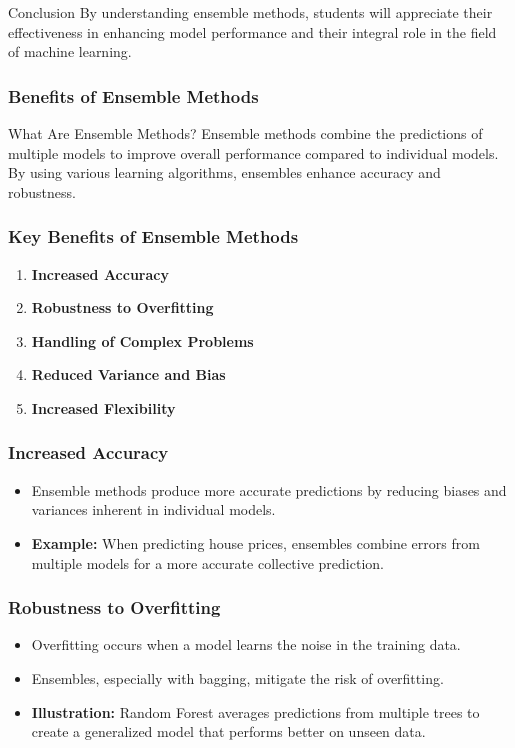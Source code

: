 \documentclass[aspectratio=169]{beamer}
\begin{document}
\begin{frame}[fragile]{Conclusion}
    By understanding ensemble methods, students will appreciate their effectiveness in enhancing model performance and their integral role in the field of machine learning.
\end{frame}

\begin{frame}[fragile]
    \frametitle{Benefits of Ensemble Methods}
    \begin{block}{What Are Ensemble Methods?}
        Ensemble methods combine the predictions of multiple models to improve overall performance compared to individual models. By using various learning algorithms, ensembles enhance accuracy and robustness.
    \end{block}
\end{frame}

\begin{frame}[fragile]
    \frametitle{Key Benefits of Ensemble Methods}
    \begin{enumerate}
        \item \textbf{Increased Accuracy}
        \item \textbf{Robustness to Overfitting}
        \item \textbf{Handling of Complex Problems}
        \item \textbf{Reduced Variance and Bias}
        \item \textbf{Increased Flexibility}
    \end{enumerate}
\end{frame}

\begin{frame}[fragile]
    \frametitle{Increased Accuracy}
    \begin{itemize}
        \item Ensemble methods produce more accurate predictions by reducing biases and variances inherent in individual models.
        \item \textbf{Example:} When predicting house prices, ensembles combine errors from multiple models for a more accurate collective prediction.
    \end{itemize}
\end{frame}

\begin{frame}[fragile]
    \frametitle{Robustness to Overfitting}
    \begin{itemize}
        \item Overfitting occurs when a model learns the noise in the training data.
        \item Ensembles, especially with bagging, mitigate the risk of overfitting.
        \item \textbf{Illustration:} Random Forest averages predictions from multiple trees to create a generalized model that performs better on unseen data.
    \end{itemize}
\end{frame}
\end{document}

